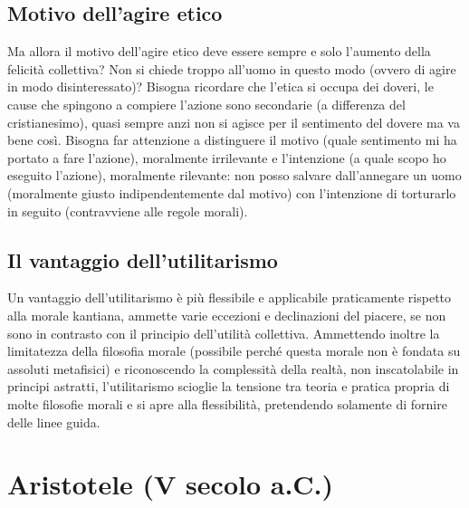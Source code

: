 \documentclass[10pt,a4paper]{article}
\begin{document}
\subsection{Motivo dell'agire etico}
Ma allora il motivo dell'agire etico deve essere sempre e solo l'aumento della felicità collettiva? Non si chiede troppo all'uomo in questo modo (ovvero di agire in modo disinteressato)? Bisogna ricordare che l'etica si occupa dei doveri, le cause che spingono a compiere l'azione sono secondarie (a differenza del cristianesimo), quasi sempre anzi non si agisce per il sentimento del dovere ma va bene così. Bisogna far attenzione a distinguere il motivo (quale sentimento mi ha portato a fare l'azione), moralmente irrilevante e l'intenzione (a quale scopo ho eseguito l'azione), moralmente rilevante: non posso salvare dall'annegare un uomo (moralmente giusto indipendentemente dal motivo) con l'intenzione di torturarlo in seguito (contravviene alle regole morali). 
\subsection{Il vantaggio dell'utilitarismo}
Un vantaggio dell'utilitarismo è più flessibile e applicabile praticamente rispetto alla morale kantiana, ammette varie eccezioni e declinazioni del piacere, se non sono in contrasto con il principio dell'utilità collettiva. Ammettendo inoltre la limitatezza della filosofia morale (possibile perché questa morale non è fondata su assoluti metafisici) e riconoscendo la complessità della realtà, non inscatolabile in principi astratti, l'utilitarismo scioglie la tensione tra teoria e pratica propria di molte filosofie morali e si apre alla flessibilità, pretendendo solamente di fornire delle linee guida. 
\newpage
\section{Aristotele (V secolo a.C.)}
\end{document}

